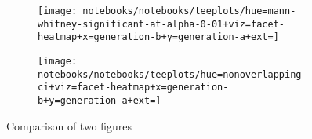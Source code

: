 \begin{figure}
  \centering

  \begin{subfigure}{\textwidth}
    \centering
    \texttt{[image: notebooks/notebooks/teeplots/hue=mann-whitney-significant-at-alpha-0-01+viz=facet-heatmap+x=generation-b+y=generation-a+ext=]}
    \label{fig:ne-detection-matrix:mann-whitney}
  \end{subfigure}

  \vspace{0.5cm} %

  \begin{subfigure}{\textwidth}
    \centering
    \texttt{[image: notebooks/notebooks/teeplots/hue=nonoverlapping-ci+viz=facet-heatmap+x=generation-b+y=generation-a+ext=]}
    \label{fig:ne-detection-matrix:ci}
  \end{subfigure}

  \caption{Comparison of two figures}
  \label{fig:ne-detection-matrix}
\end{figure}

%
